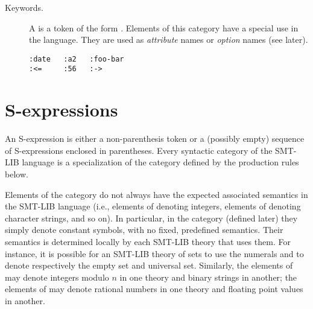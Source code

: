 \begin{description}
\item[Keywords.]
A  is
a token of the form {\ter{:}} .
Elements of this category have a special use in the language.
They are used as \emph{attribute} names or \emph{option} names (see later).

\begin{lstlisting}[linewidth=15em]
:date   :a2   :foo-bar
:<=     :56   :->
\end{lstlisting}
\end{description}




\section{S-expressions}

An S-expression is either a non-parenthesis token or 
a (possibly empty) sequence of S-ex\-press\-ions enclosed in parentheses.
Every syntactic category of the SMT-LIB language is a specialization
of the category  defined by the production rules below.
\bigskip

\sexpressions
\bigskip

\begin{remark}
Elements of the  category do not always have the expected
associated semantics in the SMT-LIB language
(i.e., elements of  denoting integers, 
elements of  denoting character strings, and so on).
In particular, in the  category (defined later) they simply denote
constant symbols, with no fixed, predefined semantics.
Their semantics is determined locally by each SMT-LIB theory that uses them.
For instance, it is possible for an SMT-LIB theory of sets to use 
the numerals  and  to denote respectively the empty set and 
universal set.
Similarly, the elements of  may denote integers modulo $n$ 
in one theory and binary strings in another;
the elements of  may denote rational numbers in one theory and 
floating point values in another.
\end{remark}



